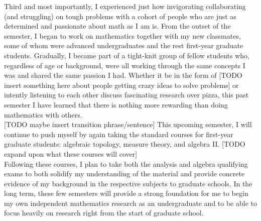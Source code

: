 \documentclass[12pt]{article}
\begin{document}



Third and most importantly, I experienced just how invigorating collaborating (and struggling) on tough problems with a cohort of people who are just as determined and passionate about math as I am is. From the outset of the semester, I began to work on mathematics together with my new classmates, some of whom were advanced undergraduates and the rest first-year graduate students. Gradually, I became part of a tight-knit group of fellow students who, regardless of age or background, were all working through the same concepts I was and shared the same passion I had. Whether it be in the form of [TODO insert something here about people getting crazy ideas to solve problems] or intently listening to each other discuss fascinating research over pizza, this past semester I have learned that there is nothing more rewarding than doing mathematics with others.
\\

[TODO maybe insert transition phrase/sentence] This upcoming semester, I will continue to push myself by again taking the standard courses for first-year graduate students: algebraic topology, measure theory, and algebra II. [TODO expand upon what these courses will cover]
\\


Following these courses, I plan to take both the analysis and algebra qualifying exams to both solidify my understanding of the material and provide concrete evidence of my background in the respective subjects to graduate schools. In the long term, these few semesters will provide a strong foundation for me to begin my own independent mathematics research as an undergraduate and to be able to focus heavily on research right from the start of graduate school.



\end{document}
